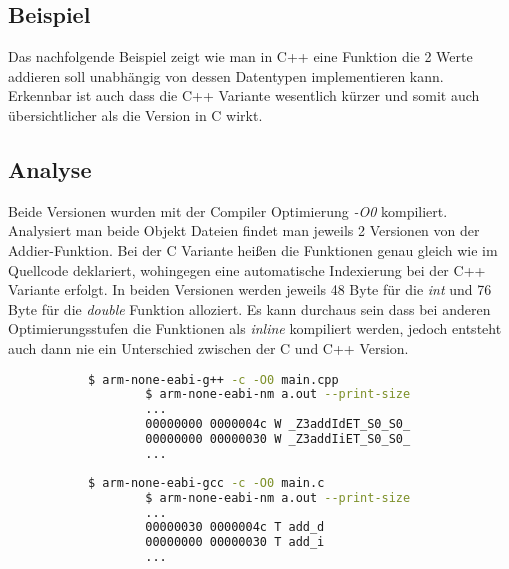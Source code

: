 \documentclass[MES,Master,ngerman]{twbook}%
\begin{document}
\subsection{Beispiel}
Das nachfolgende Beispiel zeigt wie man in C++ eine Funktion die 2 Werte addieren soll unabhängig von dessen Datentypen implementieren kann. Erkennbar ist auch dass die C++ Variante wesentlich kürzer und somit auch übersichtlicher als die Version in C wirkt.
\begin{figure}[!htb]
	\begin{subfigure}[b]{0.5\textwidth}
		
		\label{fig:5}
	\end{subfigure}
	\begin{subfigure}[b]{0.5\textwidth}
		
		\label{fig:6}
	\end{subfigure}
\end{figure}
\subsection{Analyse}

Beide Versionen wurden mit der Compiler Optimierung \textit{-O0} kompiliert. Analysiert man beide Objekt Dateien findet man jeweils 2 Versionen von der Addier-Funktion. Bei der C Variante heißen die Funktionen genau gleich wie im Quellcode deklariert, wohingegen eine automatische Indexierung bei der C++ Variante erfolgt. In beiden Versionen werden jeweils 48 Byte für die \textit{int} und 76 Byte für die \textit{double} Funktion alloziert. Es kann durchaus sein dass bei anderen Optimierungsstufen die Funktionen als \textit{inline} kompiliert werden, jedoch entsteht auch dann nie ein Unterschied zwischen der C und C++ Version.


\begin{figure}[!htb]
	\begin{subfigure}[b]{0.5\textwidth}
		\begin{lstlisting}[gobble=6, title={Analyse C++}, language=bash, numbers=none]
		$ arm-none-eabi-g++ -c -O0 main.cpp
		$ arm-none-eabi-nm a.out --print-size
		...
		00000000 0000004c W _Z3addIdET_S0_S0_
		00000000 00000030 W _Z3addIiET_S0_S0_
		...
		\end{lstlisting}
	\end{subfigure}
	\begin{subfigure}[b]{0.5\textwidth}
		\begin{lstlisting}[gobble=6, title={Analyse C}, language=bash, numbers=none]
		$ arm-none-eabi-gcc -c -O0 main.c
		$ arm-none-eabi-nm a.out --print-size
		...
		00000030 0000004c T add_d
		00000000 00000030 T add_i
		...
		\end{lstlisting}
	\end{subfigure}
\end{figure}
\end{document}
